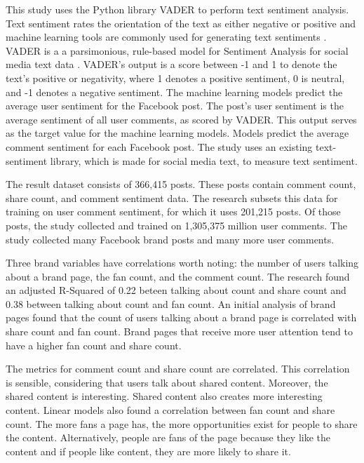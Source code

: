 \documentclass[mksc,blindrev]{informs3} %
\begin{document}
This study uses the Python library VADER to perform text sentiment analysis. Text sentiment rates the orientation of the text as either negative or positive and machine learning tools are commonly used for generating text sentiments \cite{HADDI201326}.  VADER is a a parsimonious, rule-based model for Sentiment Analysis for social media text data \cite{Gilbert}. VADER's output is a score between -1 and 1 to denote the text's positive or negativity, where 1 denotes a positive sentiment, 0 is neutral, and -1 denotes a negative sentiment. The machine learning models predict the average user sentiment for the Facebook post. The post's user sentiment is the average sentiment of all user comments, as scored by VADER. This output serves as the target value for the machine learning models. Models predict the average comment sentiment for each Facebook post. The study uses an existing text-sentiment library, which is made for social media text, to measure text sentiment.

The result dataset consists of 366,415 posts. These posts contain comment count, share count, and comment sentiment data. The research subsets this data for training on user comment sentiment, for which it uses 201,215 posts. Of those posts, the study collected and trained on 1,305,375 million user comments. The study collected many Facebook brand posts and many more user comments.

Three brand variables have correlations worth noting: the number of users talking about a brand page, the fan count, and the comment count. The research found an adjusted R-Squared of 0.22 beteen talking about count and share count and 0.38 between talking about count and fan count. An initial analysis of brand pages found that the count of users talking about a brand page is correlated with share count and fan count. Brand pages that receive more user attention tend to have a higher fan count and share count. 

The metrics for comment count and share count are correlated. This correlation is sensible, considering that users talk about shared content. Moreover, the shared content is interesting. Shared content also creates more interesting content. Linear models also found a correlation between fan count and share count. The more fans a page has, the more opportunities exist for people to share the content. Alternatively, people are fans of the page because they like the content and if people like content, they are more likely to share it. 
\end{document}

